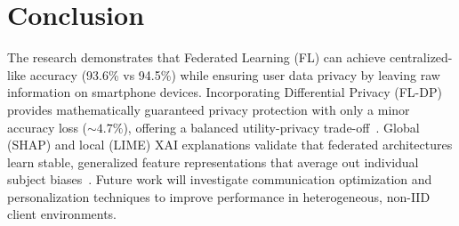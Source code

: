 
\section{Conclusion}
\label{sec:conclusion}

The research demonstrates that Federated Learning (FL) can achieve centralized-like accuracy (93.6\% vs 94.5\%) while ensuring user data privacy by leaving raw information on smartphone devices. Incorporating Differential Privacy (FL-DP) provides mathematically guaranteed privacy protection with only a minor accuracy loss ($\sim 4.7\%$), offering a balanced utility-privacy trade-off~\cite{dwork2014algorithmic,mathew2024improved}. Global (SHAP) and local (LIME) XAI explanations validate that federated architectures learn stable, generalized feature representations that average out individual subject biases~\cite{li2020federated}. Future work will investigate communication optimization and personalization techniques to improve performance in heterogeneous, non-IID client environments.
